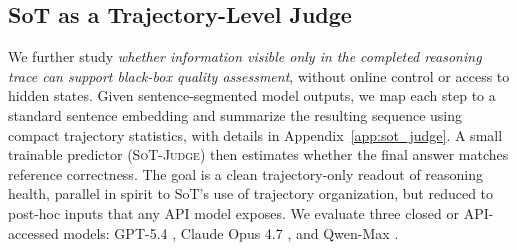     \vspace{-2mm}
    \subsection{SoT as a Trajectory-Level Judge}
    \label{sec:judge}
    \vspace{-3mm}
    
    \noindent
    \begin{minipage}[t]{0.52\columnwidth}%
        \vspace{0pt}%
        We further study \emph{whether information visible only in the completed reasoning trace can support black-box quality assessment}, without online control or access to hidden states.
        Given sentence-segmented model outputs, we map each step to a standard sentence embedding and summarize the resulting sequence using compact trajectory statistics, with details in Appendix~\ref{app:sot_judge}.
        A small trainable predictor (\textsc{SoT-Judge}) then estimates whether the final answer matches reference correctness.
        The goal is a clean trajectory-only readout of reasoning health, parallel in spirit to SoT's use of trajectory organization, but reduced to post-hoc inputs that any API model exposes. We evaluate three closed or API-accessed models: GPT-5.4 \citep{openai2025gpt54}, Claude Opus 4.7 \citep{anthropic2026claudeopus47}, and Qwen-Max \citep{alibaba2026qwenmax}.
    \end{minipage}%
    \hfill
